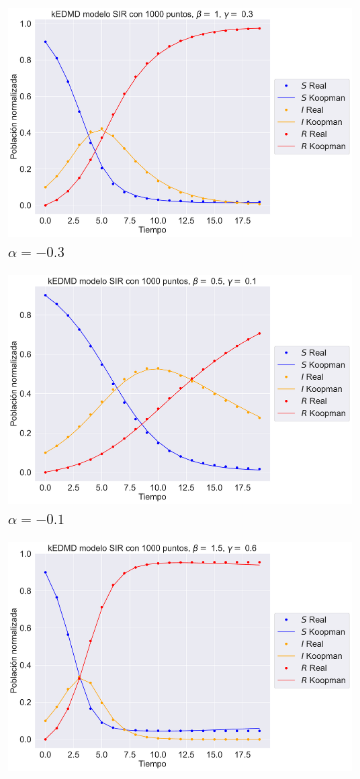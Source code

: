 \begin{figure}[htbp]
    \centering
    \begin{subfigure}[b]{0.32\textwidth}
        \centering
        \includegraphics[width=\textwidth]{img/content/chapter3/SIR1.pdf}
        \caption{$\alpha=-0.3$}
        \label{fig:image1}
    \end{subfigure}
    \hfill
    \begin{subfigure}[b]{0.32\textwidth}
        \centering
        \includegraphics[width=\textwidth]{img/content/chapter3/SIR2.pdf}
        \caption{$\alpha=-0.1$}
        \label{fig:image2}
    \end{subfigure}
    \hfill
    \begin{subfigure}[b]{0.32\textwidth}
        \centering
        \includegraphics[width=\textwidth]{img/content/chapter3/SIR3.pdf}

\end{subfigure}
\end{figure}
